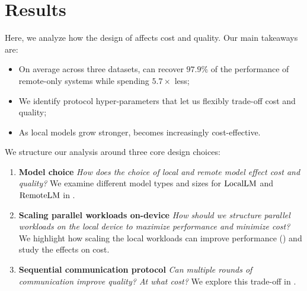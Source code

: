 

\vspace{-1em}
\section{Results}
\label{sec:results}

%

% 
% 

Here, we analyze how the design of \system affects cost and quality. Our main takeaways are: 
\begin{itemize}
\item On average across three datasets, \system can recover $97.9\%$ of the performance of remote-only systems while spending $5.7\times$ less; 
\item We identify protocol hyper-parameters that let us flexibly trade-off cost and quality;
\item As local models grow stronger, \system becomes increasingly cost-effective.
\end{itemize}

We structure our analysis around three core design choices:
\begin{enumerate}
    \item \textbf{Model choice} \textit{How does the choice of local and remote model effect cost and quality?} We examine different model types and sizes for $\mathrm{LocalLM}$ and $\mathrm{RemoteLM}$ in .\vspace{-0.5em}
    \item \textbf{Scaling parallel workloads on-device} \textit{How should we structure parallel workloads on the local device to maximize performance and minimize cost?} We highlight how scaling the local workloads can improve performance () and study the effects on cost.\vspace{-0.5em}
    \item \textbf{Sequential communication protocol} \textit{Can multiple rounds of communication improve quality? At what cost?} We explore this trade-off in .

\end{enumerate}

